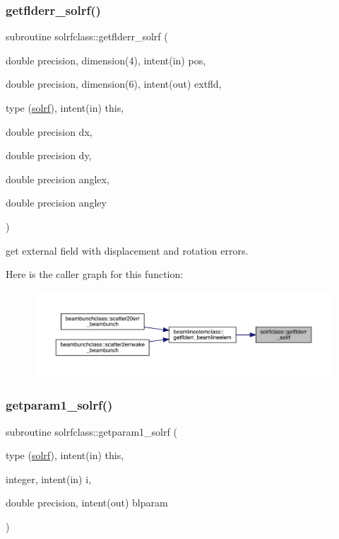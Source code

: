 \subsubsection{\texorpdfstring{getflderr\_solrf()}{getflderr\_solrf()}}
{\footnotesize\ttfamily subroutine solrfclass\+::getflderr\+\_\+solrf (\begin{DoxyParamCaption}\item[{double precision, dimension(4), intent(in)}]{pos,  }\item[{double precision, dimension(6), intent(out)}]{extfld,  }\item[{type (\mbox{\hyperlink{namespacesolrfclass_structsolrfclass_1_1solrf}{solrf}}), intent(in)}]{this,  }\item[{double precision}]{dx,  }\item[{double precision}]{dy,  }\item[{double precision}]{anglex,  }\item[{double precision}]{angley }\end{DoxyParamCaption})}



get external field with displacement and rotation errors. 

Here is the caller graph for this function\+:\nopagebreak
\begin{figure}[H]
\begin{center}
\leavevmode
\includegraphics[width=350pt]{namespacesolrfclass_a8a44826fce541cba8b4f7f5573ec7c98_icgraph}
\end{center}
\end{figure}
\mbox{\label{namespacesolrfclass_af623613497d4af2070e81c255374535e}} 
\subsubsection{\texorpdfstring{getparam1\_solrf()}{getparam1\_solrf()}}
{\footnotesize\ttfamily subroutine solrfclass\+::getparam1\+\_\+solrf (\begin{DoxyParamCaption}\item[{type (\mbox{\hyperlink{namespacesolrfclass_structsolrfclass_1_1solrf}{solrf}}), intent(in)}]{this,  }\item[{integer, intent(in)}]{i,  }\item[{double precision, intent(out)}]{blparam }\end{DoxyParamCaption})}


